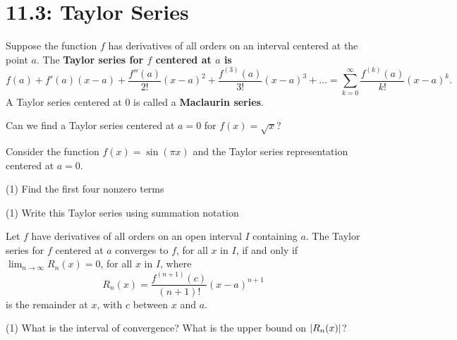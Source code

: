 \documentclass[../mathNotesPreamble]{subfiles}
\begin{document}
  \section{11.3: Taylor Series}
    \begin{defn*}
      Suppose the function $f$ has derivatives of all orders on an interval centered at the point $a$. The \textbf{Taylor series for $f$ centered at $a$ is}
        \[f(a)+f'(a)(x-a)+\frac{f''(a)}{2!}(x-a)^2+\frac{f^{(3)}(a)}{3!}(x-a)^3+\dots=\sum_{k=0}^\infty \frac{f^{(k)}(a)}{k!}(x-a)^k.\]
      A Taylor series centered at $0$ is called a \textbf{Maclaurin series}.
    \end{defn*}

    \begin{ex*}[\textcolor{blue}{LC 30.1}]
      Can we find a Taylor series centered at $a=0$ for $f(x)=\sqrt{x}$?
    \end{ex*}
    \vspace*{\baselineskip}
    \begin{ex*}[\textcolor{blue}{LC 30.2-30.5}]
      Consider the function $f(x)=\sin(\pi x)$ and the Taylor series representation centered at $a=0$.
    \end{ex*}
    \begin{tasks}[after-item-skip=\stretch{1}, label=,item-indent=0pt](1)
      \task Find the first four nonzero terms
    \end{tasks}
    \pagebreak
    \begin{tasks}[after-item-skip=\stretch{1}, label=,item-indent=0pt](1)
      \task Write this Taylor series using summation notation
    \end{tasks}
    
    \begin{thmBox*}
      Let $f$ have derivatives of all orders on an open interval $I$ containing $a$. The Taylor series for $f$ centered at $a$ converges to $f$, for all $x$ in $I$, if and only if $\displaystyle\lim_{n\to \infty} R_n(x)=0$, for all $x$ in $I$, where
        \[R_n(x)=\frac{f^{(n+1)}(c)}{(n+1)!}(x-a)^{n+1}\]
      is the remainder at $x$, with $c$ between $x$ and $a$.
    \end{thmBox*}
    \pagebreak

    \begin{tasks}[after-item-skip=\stretch{1}, label=,item-indent=0pt](1)
      \task What is the interval of convergence?
      \task What is the upper bound on ${\left\vert R_n(x)\right\vert}$?
    \end{tasks}
    
\end{document}

